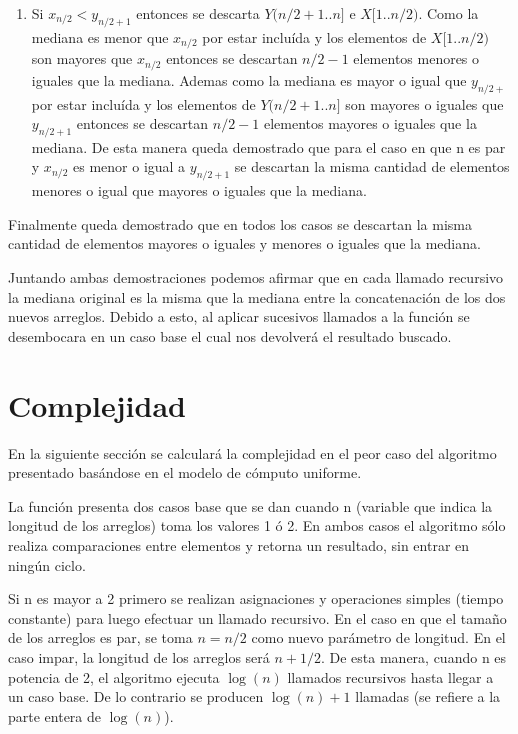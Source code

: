 \documentclass[a4paper,10pt] {article}
\begin{document}
\begin{enumerate}
\begin{enumerate}
\item
Si $x_{n/2} < y_{n/2+1}$ entonces se descarta $Y(n/2+1..n]$ e $X[1..n/2)$. Como la mediana es menor que $x_{n/2}$ por estar inclu\'ida y los elementos de $X[1..n/2)$ son mayores que $x_{n/2}$ entonces se descartan $n/2-1$ elementos menores o iguales que la mediana. Ademas como la mediana es mayor o igual que $y_{n/2+}$ por estar inclu\'ida y los elementos de $Y(n/2+1..n]$ son mayores o iguales que $y_{n/2+1}$ entonces se descartan $n/2-1$ elementos mayores o iguales que la mediana. De esta manera queda demostrado que para el caso en que n es par y $x_{n/2}$ es menor o igual a $y_{n/2+1}$ se descartan la misma cantidad de elementos menores o igual que mayores o iguales que la mediana.
\end{enumerate}

\end{enumerate}

Finalmente queda demostrado que en todos los casos se descartan la misma cantidad de elementos mayores o iguales y menores o iguales que la mediana.

Juntando ambas demostraciones podemos afirmar que en cada llamado recursivo la mediana original es la misma que la mediana entre la concatenaci\'on de los dos nuevos arreglos. Debido a esto, al aplicar sucesivos llamados a la funci\'on se desembocara en un caso base el cual nos devolver\'a el resultado buscado.

\section*{Complejidad}
 
En la siguiente secci\'on se calcular\'a la complejidad en el peor caso del algoritmo presentado bas\'andose en el modelo de c\'omputo uniforme.

La funci\'on presenta dos casos base que se dan cuando n (variable que indica la longitud de los arreglos) toma los valores 1 \'o 2. En ambos casos el algoritmo s\'olo realiza comparaciones entre elementos y retorna un resultado, sin entrar en ning\'un ciclo.

Si n es mayor a 2 primero se realizan asignaciones y operaciones simples (tiempo constante) para luego efectuar un llamado recursivo. En el caso en que el tama\~{n}o de los arreglos es par, se toma $n=n/2$ como nuevo par\'ametro de longitud. En el caso impar, la longitud de los arreglos ser\'a $n+1/2$. De esta manera, cuando n es potencia de 2, el algoritmo ejecuta $\log(n)$ llamados recursivos hasta llegar a un caso base. De lo contrario se producen $\log(n)+1$ llamadas (se refiere a la parte entera de $\log(n)$).
\end{document}
